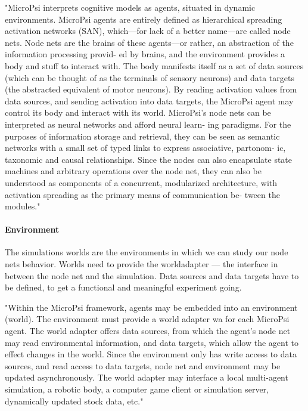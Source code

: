 "MicroPsi interprets cognitive models as agents, situated in dynamic environments. MicroPsi agents are entirely defined as hierarchical spreading activation networks (SAN), which—for lack of a better name—are called node nets. Node nets are the brains of these agents—or rather, an abstraction of the information processing provid- ed by brains, and the environment provides a body and stuff to interact with.
The body manifests itself as a set of data sources (which can be thought of as the terminals of sensory neurons) and data targets (the abstracted equivalent of motor neurons). By reading activation values from data sources, and sending activation into data targets, the MicroPsi agent may control its body and interact with its world.
MicroPsi’s node nets can be interpreted as neural networks and afford neural learn- ing paradigms. For the purposes of information storage and retrieval, they can be seen as semantic networks with a small set of typed links to express associative, partonom- ic, taxonomic and causal relationships.
Since the nodes can also encapsulate state machines and arbitrary operations over the node net, they can also be understood as components of a concurrent, modularized architecture, with activation spreading as the primary means of communication be- tween the modules."~\cite{conf/agi/Bach12}

                \paragraph{Environment}
The simulations worlds are the environments in which we can study our node nets behavior. Worlds need to provide the worldadapter --- the interface in between the node net and the simulation. Data sources and data targets have to be defined, to get a functional and meaningful experiment going.~\cite{conf/agi/Bach12}
                
"Within the MicroPsi framework, agents may be embedded into an environment (world). The environment must provide a world adapter wa for each MicroPsi agent. The world adapter offers data sources, from which the agent’s node net may read environmental information, and data targets, which allow the agent to effect changes in the world. Since the environment only has write access to data sources, and read access to data targets, node net and environment may be updated asynchronously.
The world adapter may interface a local multi-agent simulation, a robotic body, a computer game client or simulation server, dynamically updated stock data, etc."~\cite{conf/agi/Bach12}


